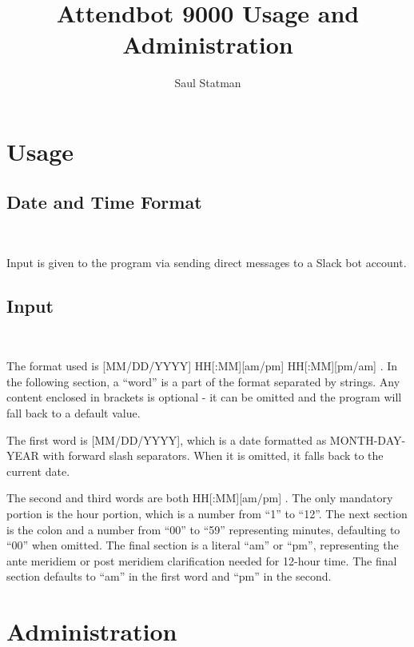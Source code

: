 \documentclass{article}
\newcommand{\tmtextmd}[1]{\text{{\mdseries{#1}}}}
\begin{document}
\title{Attendbot 9000 Usage and Administration}

\author{Saul Statman}

\maketitle

\section{Usage}

\subsection{Date and Time Format}

\

Input is given to the program via sending direct messages to a Slack bot
account.

\subsection{Input}

\

The format used is  [MM/DD/YYYY] HH[:MM][am/pm] HH[:MM][pm/am] . In the
following section, a ``word'' is a part of the format separated by strings.
Any content enclosed in brackets is optional - it can be omitted and the
program will fall back to a default value.

The first word is  [MM/DD/YYYY], which is a date formatted as MONTH-DAY-YEAR
with forward slash separators. When it is omitted, it falls back to the
current date.

The second and third words are both  HH[:MM][am/pm] . The only mandatory
portion is the hour portion, which is a number from ``1'' to ``12''. The next
section is the colon and a number from ``00'' to ``59'' representing minutes,
defaulting to ``00'' when omitted. The final section is a literal ``am'' or
``pm'', representing the ante meridiem or post meridiem clarification needed
for 12-hour time. The final section defaults to ``am'' in the first word and
``pm'' in the second.

\section{Administration\tmtextmd{}}

\
\end{document}
